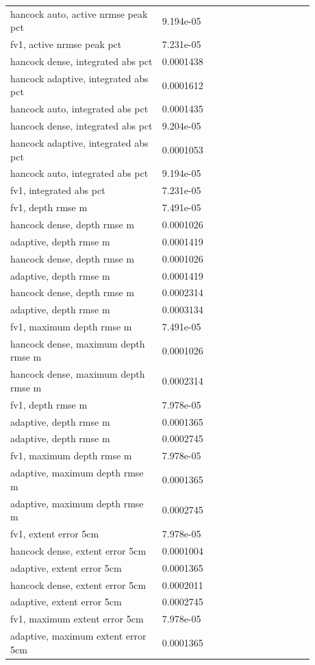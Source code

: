 \begin{longtable}{p{0.4400\linewidth}p{0.4400\linewidth}}
hancock auto, active nrmse peak pct & 9.194e-05 \\
fv1, active nrmse peak pct & 7.231e-05 \\
hancock dense, integrated abs pct & 0.0001438 \\
hancock adaptive, integrated abs pct & 0.0001612 \\
hancock auto, integrated abs pct & 0.0001435 \\
hancock dense, integrated abs pct & 9.204e-05 \\
hancock adaptive, integrated abs pct & 0.0001053 \\
hancock auto, integrated abs pct & 9.194e-05 \\
fv1, integrated abs pct & 7.231e-05 \\
fv1, depth rmse m & 7.491e-05 \\
hancock dense, depth rmse m & 0.0001026 \\
adaptive, depth rmse m & 0.0001419 \\
hancock dense, depth rmse m & 0.0001026 \\
adaptive, depth rmse m & 0.0001419 \\
hancock dense, depth rmse m & 0.0002314 \\
adaptive, depth rmse m & 0.0003134 \\
fv1, maximum depth rmse m & 7.491e-05 \\
hancock dense, maximum depth rmse m & 0.0001026 \\
hancock dense, maximum depth rmse m & 0.0002314 \\
fv1, depth rmse m & 7.978e-05 \\
adaptive, depth rmse m & 0.0001365 \\
adaptive, depth rmse m & 0.0002745 \\
fv1, maximum depth rmse m & 7.978e-05 \\
adaptive, maximum depth rmse m & 0.0001365 \\
adaptive, maximum depth rmse m & 0.0002745 \\
fv1, extent error 5cm & 7.978e-05 \\
hancock dense, extent error 5cm & 0.0001004 \\
adaptive, extent error 5cm & 0.0001365 \\
hancock dense, extent error 5cm & 0.0002011 \\
adaptive, extent error 5cm & 0.0002745 \\
fv1, maximum extent error 5cm & 7.978e-05 \\
adaptive, maximum extent error 5cm & 0.0001365 \\

\end{longtable}
